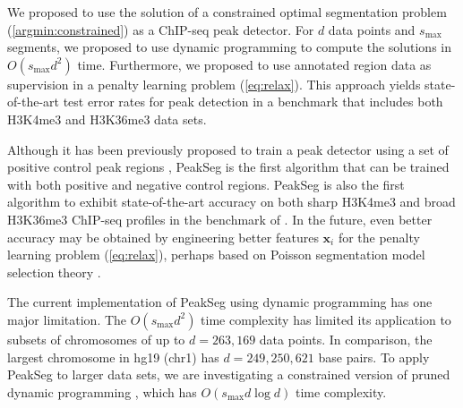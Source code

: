 \documentclass{article}
\begin{document}


We proposed to use the solution of a constrained optimal segmentation
problem (\ref{argmin:constrained}) as a ChIP-seq peak detector. For
$d$ data points and $s_{\text{max}}$ segments, we proposed to use
dynamic programming to compute the solutions in $O(s_{\text{max}} d^2)$
time. Furthermore, we proposed to use annotated region data as
supervision in a penalty learning problem (\ref{eq:relax}). This
approach yields state-of-the-art test error rates for peak detection
in a benchmark that includes both H3K4me3 and H3K36me3 data
sets.

Although it has been previously proposed to train a peak detector
using a set of positive control peak regions \citep{DFilter}, PeakSeg
is the first algorithm that can be trained with both positive and
negative control regions. PeakSeg is also the first algorithm to
exhibit state-of-the-art accuracy on both sharp H3K4me3 and broad
H3K36me3 ChIP-seq profiles in the benchmark of
\citet{hocking2014visual}. In the future, even better accuracy may be
obtained by engineering better features $\mathbf x_i$ for the penalty
learning problem (\ref{eq:relax}), perhaps based on Poisson
segmentation model selection theory \citep{cleynen2013segmentation}.

The current implementation of PeakSeg using dynamic programming has
one major limitation. The $O(s_{\text{max}} d^2)$ time complexity has
limited its application to subsets of chromosomes of up to $d=263,169$
data points. In comparison, the largest chromosome in hg19 (chr1) has
$d=249,250,621$ base pairs. To apply PeakSeg to larger data sets, we
are investigating a constrained version of pruned dynamic programming
\citep{pruned-dp, Segmentor}, which has $O(s_{\text{max}} d\log d)$
time complexity.
\end{document}
